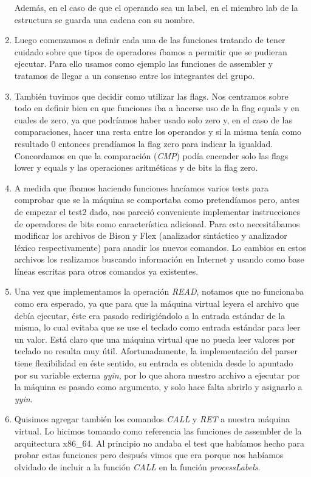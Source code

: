 \documentclass[a4paper,12pt]{article}
\begin{document}
\begin{enumerate}
Adem\'as, en el caso de que el operando sea un label, en el miembro lab de la estructura se guarda una cadena con su nombre. 
\item
Luego comenzamos a definir cada una de las funciones tratando de tener cuidado sobre que tipos de operadores \'ibamos a permitir que se pudieran ejecutar. Para ello usamos como ejemplo las funciones de assembler y tratamos de llegar a un consenso entre los integrantes del grupo.
\item
Tambi\'en tuvimos que decidir como utilizar las flags. Nos centramos sobre todo en definir bien en que funciones iba a hacerse uso de la flag equals y en cuales de zero, ya que podr\'iamos haber usado solo zero y, en el caso de las comparaciones, hacer una resta entre los operandos y si la misma ten\'ia como resultado 0 entonces prend\'iamos la flag zero para indicar la igualdad. Concordamos en que la comparaci\'on (\emph{CMP}) pod\'ia encender solo las flags lower y equals y las operaciones aritm\'eticas y de bits la flag zero.
\item 
A medida que \'ibamos haciendo funciones hac\'iamos varios tests para comprobar que se la m\'aquina se comportaba como pretend\'iamos pero, antes de empezar el test2 dado, nos pareci\'o conveniente implementar instrucciones de operadores de bits como caracter\'istica adicional. Para esto necesit\'abamos modificar los archivos de Bison y Flex (analizador sint\'actico y analizador l\'exico respectivamente) para anadir los nuevos comandos. Lo cambios en estos archivos los realizamos buscando informaci\'on en Internet y usando como base l\'ineas escritas para otros comandos ya existentes.
\item
Una vez que implementamos la operaci\'on \emph{READ}, notamos que no funcionaba como era esperado, ya que para que la m\'aquina virtual leyera el archivo que deb\'ia ejecutar, \'este era pasado redirigi\'endolo a la entrada est\'andar de la misma, lo cual evitaba que se use el teclado como entrada est\'andar para leer un valor.
Est\'a claro que una m\'aquina virtual que no pueda leer valores por teclado no resulta muy \'util. Afortunadamente, la implementaci\'on del parser tiene flexibilidad en \'este sentido, su entrada es obtenida desde lo apuntado por su variable externa \emph{yyin}, por lo que ahora nuestro archivo a ejecutar por la m\'aquina es pasado como argumento, y solo hace falta abrirlo y asignarlo a \emph{yyin}.
\item
Quisimos agregar tambi\'en los comandos \emph{CALL} y \emph{RET} a nuestra m\'aquina virtual. Lo hicimos tomando como referencia las funciones de assembler de la arquitectura x86\_64. Al principio no andaba el test que hab\'iamos hecho para probar estas funciones pero despu\'es vimos que era porque nos hab\'iamos olvidado de incluir a la funci\'on \emph{CALL} en la funci\'on \emph{processLabels}. 
\end{enumerate}
\end{document}
